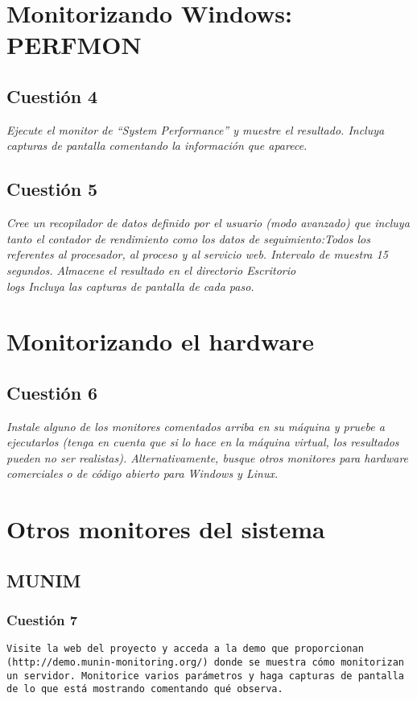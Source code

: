 \section{Monitorizando Windows: PERFMON}
\subsection{Cuestión 4}
\textit{Ejecute el monitor de “System Performance” y muestre el resultado. Incluya capturas de pantalla comentando la información que aparece.}
\subsection{Cuestión 5}
\textit{Cree un recopilador de datos definido por el usuario (modo avanzado) que incluya tanto el contador de rendimiento como los datos de seguimiento:Todos los referentes al procesador, al proceso y al servicio web. Intervalo de muestra 15 segundos. Almacene el resultado en el directorio Escritorio\\logs Incluya las capturas de pantalla de cada paso.}
\section{Monitorizando el hardware}
\subsection{Cuestión 6}
\textit{Instale alguno de los monitores comentados arriba en su máquina y pruebe a ejecutarlos (tenga en cuenta que si lo hace en la máquina virtual, los resultados pueden no ser realistas). Alternativamente, busque otros monitores para hardware comerciales o de código abierto para Windows y Linux.}
\section{Otros monitores del sistema}
\subsection{MUNIM}
\subsubsection{Cuestión 7}
\texttt{Visite la web del proyecto y acceda a la demo que proporcionan (http://demo.munin-monitoring.org/) donde se muestra cómo monitorizan un servidor. Monitorice varios parámetros y haga capturas de pantalla de lo que está mostrando comentando qué observa.}
